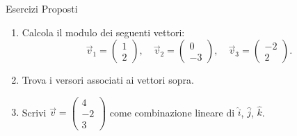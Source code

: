 \documentclass{beamer}
\begin{document}
\begin{frame}{Esercizi Proposti}
    \begin{enumerate}
        \item Calcola il modulo dei seguenti vettori:
        \[
        \vec{v}_1 =
        \begin{pmatrix}
            1 \\
            2
        \end{pmatrix}, \quad
        \vec{v}_2 =
        \begin{pmatrix}
            0 \\
            -3
        \end{pmatrix}, \quad
        \vec{v}_3 =
        \begin{pmatrix}
            -2 \\
            2
        \end{pmatrix}.
        \]
        \item Trova i versori associati ai vettori sopra.
        \item Scrivi $\vec{v} =
        \begin{pmatrix}
            4 \\
            -2 \\
            3
        \end{pmatrix}$ come combinazione lineare di $\hat{i}$, $\hat{j}$, $\hat{k}$.
    \end{enumerate}
\end{frame}

\end{document}

